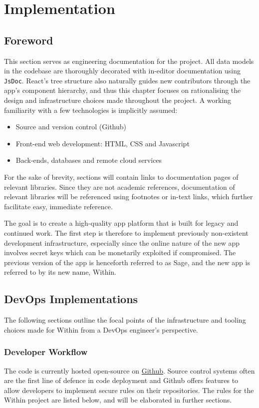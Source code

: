 \chapter{Implementation}
\section{Foreword}
This section serves as engineering documentation for the project. All data models in the codebase are thoroughly decorated with in-editor documentation using \texttt{JsDoc}. React's tree structure also naturally guides new contributors through the app's component hierarchy, and thus this chapter focuses on rationalising the design and infrastructure choices made throughout the project. A working familiarity with a few technologies is implicitly assumed:

\begin{itemize}
    \item Source and version control (Github)
    \item Front-end web development: HTML, CSS and Javascript
    \item Back-ends, databases and remote cloud services
\end{itemize}

For the sake of brevity, sections will contain links to documentation pages of relevant libraries. Since they are not academic references, documentation of relevant libraries will be referenced using footnotes or in-text links, which further facilitate easy, immediate reference.

The goal is to create a high-quality app platform that is built for legacy and continued work. The first step is therefore to implement previously non-existent development infrastructure, especially since the online nature of the new app involves secret keys which can be monetarily exploited if compromised. The previous version of the app is henceforth referred to as Sage, and the new app is referred to by its new name, Within.


\section{DevOps Implementations}
The following sections outline the focal points of the infrastructure and tooling choices made for Within from a DevOps engineer's perspective.


\subsection{Developer Workflow}
The code is currently hosted open-source on \href{https://github.com/Darrekt/within-react-native}{Github}. Source control systems often are the first line of defence in code deployment and Github offers features to allow developers to implement secure rules on their repositories. The rules for the Within project are listed below, and will be elaborated in further sections.

